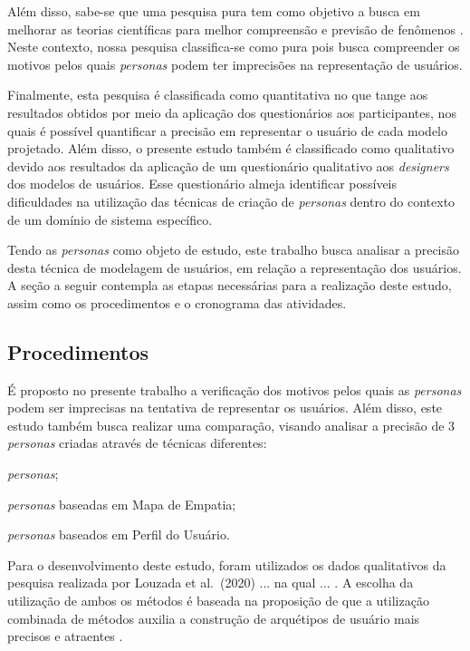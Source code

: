 \documentclass[12pt]{article}
\begin{document}
Além disso, sabe-se que uma pesquisa pura tem como objetivo a busca em melhorar as teorias científicas para melhor compreensão e previsão de fenômenos \cite{1954-06834-000}. Neste contexto, nossa pesquisa classifica-se como pura pois busca compreender os motivos pelos quais \emph{personas} podem ter imprecisões na representação de usuários. 

\par Finalmente, esta pesquisa é classificada como quantitativa no que tange aos resultados obtidos por meio da aplicação dos questionários aos participantes, nos quais é possível quantificar a precisão em representar o usuário de cada modelo projetado. Além disso, o presente estudo também é classificado como qualitativo devido aos resultados da aplicação de um questionário qualitativo aos \emph{designers} dos modelos de usuários. Esse questionário almeja identificar possíveis dificuldades na utilização das técnicas de criação de \emph{personas} dentro do contexto de um domínio de sistema específico.

\par Tendo as \emph{personas} como objeto de estudo, este trabalho busca analisar a precisão desta técnica de modelagem de usuários, em relação a representação dos usuários. A seção a seguir contempla as etapas necessárias para a realização deste estudo, assim como os procedimentos e o cronograma das atividades.

\subsection{Procedimentos}
\par É proposto no presente trabalho a verificação dos motivos pelos quais as \emph{personas} podem ser imprecisas na tentativa de representar os usuários. Além disso, este estudo também busca realizar uma comparação, visando analisar a precisão de 3 \emph{personas} criadas através de técnicas diferentes: 
\begin{enumerate*}[label=\roman*)]
    \item \emph{personas};
    \item \emph{personas} baseadas em Mapa de Empatia;
    \item \emph{personas} baseados em Perfil do Usuário.
\end{enumerate*} 

Para o desenvolvimento deste estudo, foram utilizados os dados qualitativos da pesquisa realizada por Louzada et al. (2020) ... na qual ... \cite{louzadaIHC}. A escolha da utilização de ambos os métodos é baseada na proposição de que a utilização combinada de métodos auxilia a construção de arquétipos de usuário mais precisos e atraentes \cite{10.1145/3313831.3376502}.
       
\end{document}
